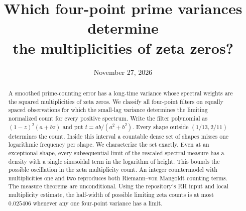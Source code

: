 \documentclass[11pt,letterpaper]{article}
\title{Which four-point prime variances determine\\the multiplicities of zeta zeros?}
\author{}
\date{November 27, 2026}
\begin{document}
\maketitle
\begin{abstract}
A smoothed prime-counting error has a long-time variance whose spectral weights are the squared multiplicities of zeta zeros. We classify all four-point filters on equally spaced observations for which the small-lag variance determines the limiting normalized count for every positive spectrum. Write the filter polynomial as $(1-z)^2(a+bz)$ and put $t=ab/(a^2+b^2)$. Every shape outside $(1/13,2/11)$ determines the count. Inside this interval a countable dense set of shapes misses one logarithmic frequency per shape. We characterize the set exactly. Even at an exceptional shape, every subsequential limit of the rescaled spectral measure has a density with a single sinusoidal term in the logarithm of height. This bounds the possible oscillation in the zeta multiplicity count. An integer countermodel with multiplicities one and two reproduces both Riemann--von Mangoldt counting terms. The measure theorems are unconditional. Using the repository's RH input and local multiplicity estimate, the half-width of possible limiting zeta counts is at most $0.025406$ whenever any one four-point variance has a limit.
\end{abstract}
\end{document}
